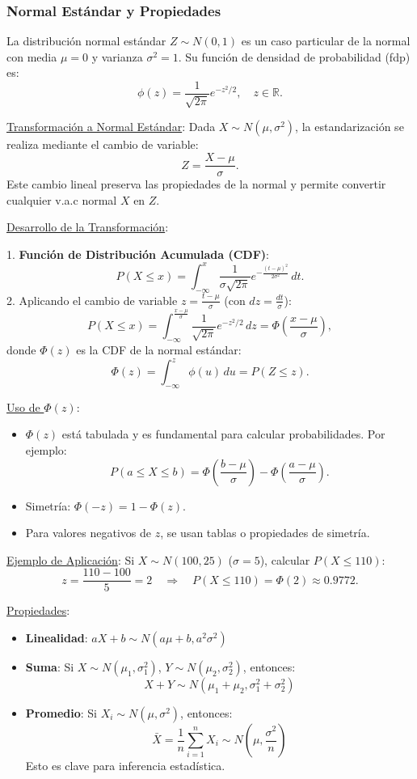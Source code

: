 \documentclass[letterpaper]{article}
\begin{document}
	\subsubsection{Normal Estándar y Propiedades}
	La distribución normal estándar \( Z \sim N(0, 1) \) es un caso particular de la normal con media \(\mu = 0\) y varianza \(\sigma^2 = 1\). Su función de densidad de probabilidad (fdp) es:
	\[ \phi(z) = \frac{1}{\sqrt{2\pi}} e^{-z^2/2}, \quad z \in \mathbb{R}. \]
	
	\underline{Transformación a Normal Estándar}:
	Dada \( X \sim N(\mu, \sigma^2) \), la estandarización se realiza mediante el cambio de variable:
	\[ Z = \frac{X - \mu}{\sigma}. \]
	Este cambio lineal preserva las propiedades de la normal y permite convertir cualquier v.a.c normal \( X \) en \( Z \). 
	
	\underline{Desarrollo de la Transformación}:
	
	1. \textbf{Función de Distribución Acumulada (CDF)}: 
	\[ P(X \leq x) = \int_{-\infty}^{x} \frac{1}{\sigma \sqrt{2\pi}} e^{-\frac{(t - \mu)^2}{2\sigma^2}} \, dt. \]
	2. Aplicando el cambio de variable \( z = \frac{t - \mu}{\sigma} \) (con \( dz = \frac{dt}{\sigma} \)):
	\[ P(X \leq x) = \int_{-\infty}^{\frac{x - \mu}{\sigma}} \frac{1}{\sqrt{2\pi}} e^{-z^2/2} \, dz = \Phi\left(\frac{x - \mu}{\sigma}\right), \]
	donde \(\Phi(z)\) es la CDF de la normal estándar:
	\[ \Phi(z) = \int_{-\infty}^{z} \phi(u) \, du = P(Z \leq z). \]
	
	\underline{Uso de \(\Phi(z)\)}:
	\begin{itemize}
		\item \(\Phi(z)\) está tabulada y es fundamental para calcular probabilidades. Por ejemplo:
		\[ P(a \leq X \leq b) = \Phi\left(\frac{b - \mu}{\sigma}\right) - \Phi\left(\frac{a - \mu}{\sigma}\right). \]
		\item Simetría: \(\Phi(-z) = 1 - \Phi(z)\).
		\item Para valores negativos de \(z\), se usan tablas o propiedades de simetría.
	\end{itemize}
	
	\underline{Ejemplo de Aplicación}:
	Si \( X \sim N(100, 25) \) (\(\sigma = 5\)), calcular \( P(X \leq 110) \):
	\[ z = \frac{110 - 100}{5} = 2 \quad \Rightarrow \quad P(X \leq 110) = \Phi(2) \approx 0.9772. \]
	
	\underline{Propiedades}:
	\begin{itemize}
		\item \textbf{Linealidad}: $aX + b \sim N(a\mu + b, a^2 \sigma^2)$
		\item \textbf{Suma}: Si $X \sim N(\mu_1, \sigma_1^2)$, $Y \sim N(\mu_2, \sigma_2^2)$, entonces:
		\[ X + Y \sim N(\mu_1 + \mu_2, \sigma_1^2 + \sigma_2^2) \]
		\item \textbf{Promedio}: Si $X_i \sim N(\mu, \sigma^2)$, entonces:
		\[ \bar{X} = \frac{1}{n} \sum_{i=1}^n X_i \sim N\left(\mu, \frac{\sigma^2}{n}\right) \]
		Esto es clave para inferencia estadística.
	\end{itemize}
	
\end{document}
